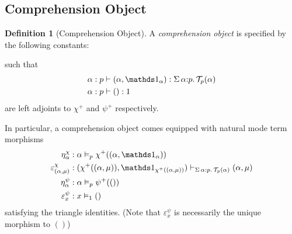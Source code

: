 \documentclass[10pt]{article}
\theoremstyle{definition}
\newtheorem{definition}{Definition}
\newcommand{\yields}{\vdash}
\newcommand{\type}{\,\,\mathsf{mode}}
\newcommand{\sigmacl}[3]{\ensuremath{\textnormal{$\Sigma$}\,#1{:}#2.\,#3}}
\newcommand\TypeTwo[4]{\ensuremath{#1 \mid #3 \vDash #2 : #4}}
\newcommand\TrPlus[2]{\ensuremath{{#1}^+(#2)}}
\newcommand\El[2]{\mathcal{T}_{#1}(#2)}
\begin{document}
\subsection{Comprehension Object}
\newcommand\var[1]{\ensuremath{\mathtt{var}_{#1}}}
\newcommand\ApOne[1]{\ensuremath{\One_{\langle {#1} \rangle }}}

\begin{definition}[Comprehension Object]\label{def:comprehension-object}
  A \emph{comprehension object} is specified by the following
  constants:
  such that
\begin{align*}
\alpha : p &\yields (\alpha, \One_\alpha) : \sigmacl{\alpha}{p}{\El{p}{\alpha}} \\
\alpha : p &\yields () : 1
\end{align*}
are left adjoints to $\chi^+$ and $\psi^+$ respectively.
\end{definition}

In particular, a comprehension object comes equipped with natural mode term morphisms
\begin{align*}
\eta^\chi_\alpha {}&: \alpha \vDash_p \TrPlus{\chi}{(\alpha, \One_\alpha)} \\
\varepsilon^\chi_{(\alpha, \mu)} {}&: (\TrPlus{\chi}{(\alpha, \mu)}, \One_{\TrPlus{\chi}{(\alpha, \mu)}}) \yields_{\sigmacl{\alpha}{p}{\El{p}{\alpha}}} (\alpha, \mu) \\
\eta^\psi_\alpha {}&: \alpha \vDash_p \TrPlus{\psi}{()} \\
\varepsilon^\psi_{x} {}&: x \vDash_1 ()
\end{align*}
satisfying the triangle identities. (Note that $\varepsilon^\psi_x$ is necessarily the unique morphism to $()$)
\end{document}
